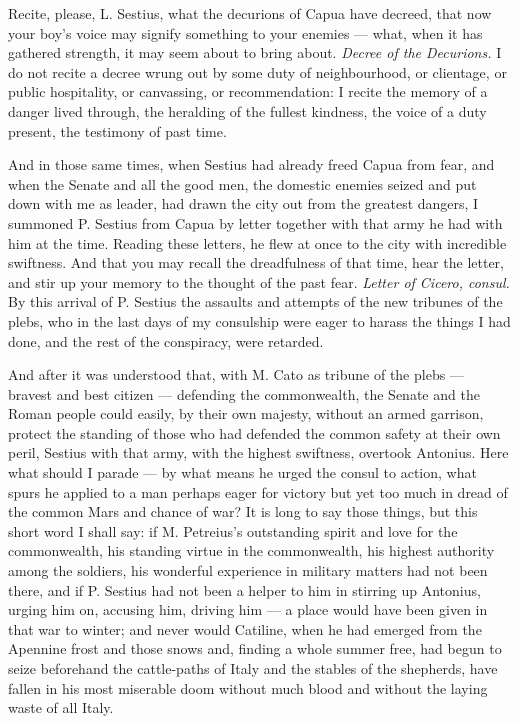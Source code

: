  Recite, please, L. Sestius, what the decurions of Capua have decreed, that now your boy's voice may signify something to your enemies --- what, when it has gathered strength, it may seem about to bring about. \textit{Decree of the Decurions.} I do not recite a decree wrung out by some duty of neighbourhood, or clientage, or public hospitality, or canvassing, or recommendation: I recite the memory of a danger lived through, the heralding of the fullest kindness, the voice of a duty present, the testimony of past time.

 And in those same times, when Sestius had already freed Capua from fear, and when the Senate and all the good men, the domestic enemies seized and put down with me as leader, had drawn the city out from the greatest dangers, I summoned P. Sestius from Capua by letter together with that army he had with him at the time. Reading these letters, he flew at once to the city with incredible swiftness. And that you may recall the dreadfulness of that time, hear the letter, and stir up your memory to the thought of the past fear. \textit{Letter of Cicero, consul.} By this arrival of P. Sestius the assaults and attempts of the new tribunes of the plebs, who in the last days of my consulship were eager to harass the things I had done, and the rest of the conspiracy, were retarded.

 And after it was understood that, with M. Cato as tribune of the plebs --- bravest and best citizen --- defending the commonwealth, the Senate and the Roman people could easily, by their own majesty, without an armed garrison, protect the standing of those who had defended the common safety at their own peril, Sestius with that army, with the highest swiftness, overtook Antonius. Here what should I parade --- by what means he urged the consul to action, what spurs he applied to a man perhaps eager for victory but yet too much in dread of the common Mars and chance of war? It is long to say those things, but this short word I shall say: if M. Petreius's outstanding spirit and love for the commonwealth, his standing virtue in the commonwealth, his highest authority among the soldiers, his wonderful experience in military matters had not been there, and if P. Sestius had not been a helper to him in stirring up Antonius, urging him on, accusing him, driving him --- a place would have been given in that war to winter; and never would Catiline, when he had emerged from the Apennine frost and those snows and, finding a whole summer free, had begun to seize beforehand the cattle-paths of Italy and the stables of the shepherds, have fallen in his most miserable doom without much blood and without the laying waste of all Italy.

